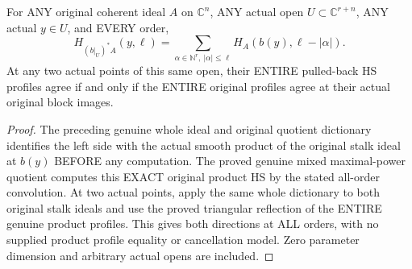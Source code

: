 \begin{theorem}
\label{hir:actual-open-block-projection-intrinsic-hs-convolution-reflection}
\leanok
For ANY original coherent ideal $A$ on $\mathbb C^n$, ANY actual open
$U\subset\mathbb C^{r+n}$, ANY actual $y\in U$, and EVERY order,
\[
 H_{(b|_U)^*A}(y,\ell)=\sum_{\alpha\in\mathbb N^r,\ |\alpha|\le\ell}
 H_A(b(y),\ell-|\alpha|).
\]
At any two actual points of this same open, their ENTIRE pulled-back HS
profiles agree if and only if the ENTIRE original profiles agree at their
actual original block images.
\end{theorem}
\begin{proof}
The preceding genuine whole ideal and original quotient dictionary identifies
the left side with the actual smooth product of the original stalk ideal
at $b(y)$ BEFORE any computation. The proved genuine mixed maximal-power
quotient computes this EXACT original product HS by the stated all-order
convolution. At two actual points, apply the same whole dictionary to both
original stalk ideals and use the proved triangular reflection of the
ENTIRE genuine product profiles. This gives both directions at ALL orders,
with no supplied product profile equality or cancellation model. Zero
parameter dimension and arbitrary actual opens are included.
\end{proof}
